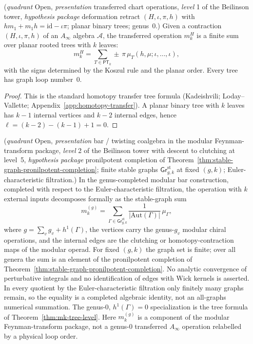 \begin{theorem}
\label{thm:mk-tree-level}
\textup{(}\emph{quadrant} Open, \emph{presentation} transferred chart
operations, \emph{level} 1 of the Beilinson tower,
\emph{hypothesis package} deformation retract $(H, \iota, \pi, h)$ with
$h m_1 + m_1 h = \mathrm{id} - \iota\pi$; planar binary trees;
genus~$0$.\textup{)}
Given a contraction $(H,\iota,\pi,h)$ of an $A_\infty$ algebra
$\mathcal A$, the transferred operation $m_k^H$ is a finite sum over
planar rooted trees with $k$ leaves:
\[
m_k^H =
\sum_{T \in \mathsf{PT}_k}
\pm\,\pi\,\mu_T(h,\mu;\iota,\ldots,\iota),
\]
with the signs determined by the Koszul rule and the planar order.
Every tree has graph loop number~$0$.
\end{theorem}

\begin{proof}
This is the standard homotopy transfer tree formula
(Kadeishvili; Loday--Vallette; Appendix~\ref{app:homotopy-transfer}).
A planar binary tree with $k$ leaves has $k-1$ internal vertices and
$k-2$ internal edges, hence
$\ell=(k-2)-(k-1)+1=0$.
\end{proof}

\begin{theorem}
\label{thm:mk-general-structure-vol1}
\textup{(}\emph{quadrant} Open, \emph{presentation} bar / twisting
coalgebra in the modular Feynman-transform package,
\emph{level} 2 of the Beilinson tower with descent to clutching at
level~5, \emph{hypothesis package} pronilpotent completion of
Theorem~\ref{thm:stable-graph-pronilpotent-completion}; finite stable
graphs $\mathsf{Gr}^{\mathrm{st}}_{g,k}$ at fixed $(g, k)$;
Euler-characteristic filtration.\textup{)}
In the genus-completed modular bar construction, completed with respect
to the Euler-characteristic filtration, the operation with $k$ external
inputs decomposes formally as the stable-graph sum
\[
m_k^{(g)} =
\sum_{\Gamma \in \mathsf{Gr}^{\mathrm{st}}_{g,k}}
\frac{1}{|\mathrm{Aut}(\Gamma)|}\,\mu_\Gamma,
\]
where
$g=\sum_v g_v+h^1(\Gamma)$, the vertices carry the genus-$g_v$
modular chiral operations, and the internal edges are the clutching or
homotopy-contraction maps of the modular operad.  For fixed $(g,k)$
the graph set is finite; over all genera the sum is an element of the
pronilpotent completion of
Theorem~\textup{\ref{thm:stable-graph-pronilpotent-completion}}.  No
analytic convergence of perturbative integrals and no identification
of edges with Wick kernels is asserted.  In every quotient by the
Euler-characteristic filtration only finitely many graphs remain, so
the equality is a completed algebraic identity, not an all-graphs
numerical summation.  The genus-$0$, $h^1(\Gamma)=0$ specialization is
the tree formula of
Theorem~\textup{\ref{thm:mk-tree-level}}.
Here $m_k^{(g)}$ is a component of the modular Feynman-transform
package, not a genus-$0$ transferred $A_\infty$ operation relabelled by
a physical loop order.
\end{theorem}

